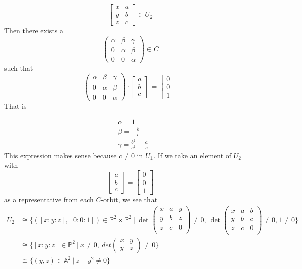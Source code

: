 \begin{example}
\[
	\begin{bmatrix}
	x&a\\
	y&b\\
	z&c
	\end{bmatrix}
	\in U_2
\]
Then there exists a 
\[
	\begin{pmatrix}
		\alpha & \beta & \gamma \\
		0 & \alpha & \beta \\
		0 & 0 & \alpha	
	\end{pmatrix}
	\in
	C
\]
such that
\[
	\begin{pmatrix}
		\alpha & \beta & \gamma \\
		0 & \alpha & \beta \\
		0 & 0 & \alpha	
	\end{pmatrix}
	\cdot
	\begin{bmatrix}
		a\\
		b\\
		c
	\end{bmatrix}
	=
	\begin{bmatrix}
		0\\
		0\\
		1
	\end{bmatrix}	
\] 
That is 

	\begin{align*}
		&\alpha=1\\
		&\beta=-\frac{b}{c}\\
		&\gamma=\frac{b^2}{c^2}-\frac{a}{c}
	\end{align*}
This expression makes sense because $c\neq 0$ in $U_1$.
If we take an element of $U_2$ with 
\[
	\begin{bmatrix}
		a\\
		b\\
		c
	\end{bmatrix}
	=
	\begin{bmatrix}
		0\\
		0\\
		1
	\end{bmatrix}	
\]
as a representative from each $C$-orbit, we see that 
\begin{align*}
	\overline{U}_2
	&\cong
	\{
	([x:y:z],[0:0:1])\in \mathbb{P}^2 \times \mathbb{P}^2~|~
	\operatorname{det}
	\begin{pmatrix}
	x&a&y\\
	y&b&z\\
	z&c&0\\
	\end{pmatrix}
	\neq 0,~
	\operatorname{det}
	\begin{pmatrix}
	x&a&b\\
	y&b&c\\
	z&c&0\\
	\end{pmatrix}
	\neq 0,
	1\neq 0	 	
	\}\\
	&\cong
	\{
	[x:y:z]\in \mathbb{P}^2~|~
	x\neq 0,~
	det	
	\begin{pmatrix}
	x&y\\
	y&z
	\end{pmatrix}
	\neq 0	 	
	\}\\
	&\cong
	\{
	(y,z)\in \mathbb{A}^2~|~
	z-y^2\neq 0 	
	\}	
\end{align*}


\end{example}
